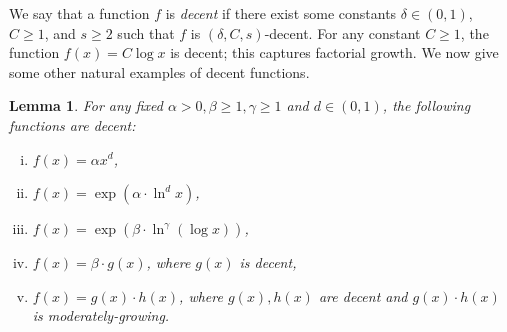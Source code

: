 \documentclass[letterpaper,11pt]{article}
\newcommand{\dec}{decent\xspace}
\newcommand{\Slinn}{moderately-growing\xspace}
\newtheorem{lemma}[theorem]{Lemma}
\theoremstyle{definition}
\theoremstyle{remark}
\renewcommand{\geq}{\geqslant}
\begin{document}
		
		
		We say that a function $f $ is \textit{\dec} if there  exist some constants $\delta\in (0,1)$, $C\geq 1 $, and $s\geq 2$ such that $f$ is $(\delta,C,s)$-\dec. For any constant $C\geq 1$, the function $f(x)=C\log x$ is decent; this captures factorial growth. We now give some other natural examples of \dec functions. 
		
		\begin{lemma}\label{lem:manydecent}
			For any fixed $\alpha>0,\beta\geq 1 ,\gamma \geq 1 $ and $d\in (0,1)$, the following functions are \dec:
			\begin{enumerate}[(i)]
				\item  $f(x) = \alpha x^d$,
				\item $f(x) = \exp\left(\alpha \cdot  \ln^d x \right) $,
				\item $f(x) = \exp\left(\beta \cdot  \ln^\gamma(\log x) \right) $,
				\item $f(x) = \beta \cdot g(x)$, where $g(x)$ is \dec,
				\item $f(x) = g(x)\cdot h(x)$, where $g(x),h(x)$ are \dec and  $g(x)\cdot h(x)$ is \Slinn. 	
			\end{enumerate}
		\end{lemma}
\end{document}
